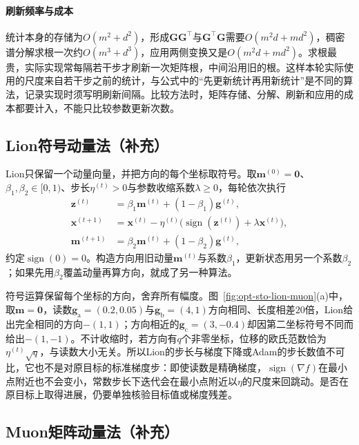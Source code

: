 \paragraph{刷新频率与成本}
统计本身的存储为$O(m^2+d^2)$，形成$\bm G\bm G^\top$与$\bm G^\top\bm G$需要$O(m^2d+md^2)$，稠密谱分解求根一次约$O(m^3+d^3)$，应用两侧变换又是$O(m^2d+md^2)$。求根最贵，实际实现常每隔若干步才刷新一次矩阵根，中间沿用旧的根。这样本轮实际使用的尺度来自若干步之前的统计，与公式中的“先更新统计再用新统计”是不同的算法，记录实现时须写明刷新间隔。比较方法时，矩阵存储、分解、刷新和应用的成本都要计入，不能只比较参数更新次数。

\subsection{Lion符号动量法（补充）}
\label{sec:opt-sto-lion}

Lion只保留一个动量向量，并把方向的每个坐标取符号。取$\bm m^{(0)}=\bm0$、$\beta_1,\beta_2\in[0,1)$、步长$\eta^{(t)}>0$与参数收缩系数$\lambda\geq0$，每轮依次执行
\[
  \begin{aligned}
    \bm z^{(t)}&=\beta_1\bm m^{(t)}+(1-\beta_1)\bm g^{(t)},\\
    \bm x^{(t+1)}&=\bm x^{(t)}-\eta^{(t)}\bigl(\operatorname{sign}(\bm z^{(t)})+\lambda\bm x^{(t)}\bigr),\\
    \bm m^{(t+1)}&=\beta_2\bm m^{(t)}+(1-\beta_2)\bm g^{(t)},
  \end{aligned}
\]
约定$\operatorname{sign}(0)=0$。构造方向用旧动量$\bm m^{(t)}$与系数$\beta_1$，更新状态用另一个系数$\beta_2$；如果先用$\beta_2$覆盖动量再算方向，就成了另一种算法。

符号运算保留每个坐标的方向，舍弃所有幅度。图~\ref{fig:opt-sto-lion-muon}(a)中，取$\bm m=\bm0$，读数$\bm g_{\mathrm a}=(0.2,0.05)$与$\bm g_{\mathrm b}=(4,1)$方向相同、长度相差$20$倍，Lion给出完全相同的方向$-(1,1)$；方向相近的$\bm g_{\mathrm c}=(3,-0.4)$却因第二坐标符号不同而给出$-(1,-1)$。不计收缩时，若方向有$q$个非零坐标，位移的欧氏范数恰为$\eta^{(t)}\sqrt q$，与读数大小无关。所以Lion的步长与梯度下降或Adam的步长数值不可比，它也不是对原目标的标准梯度步：即使读数是精确梯度，$\operatorname{sign}(\nabla f)$在最小点附近也不会变小，常数步长下迭代会在最小点附近以$\eta$的尺度来回跳动。是否在原目标上取得进展，仍要单独核验目标值或梯度残差。

\subsection{Muon矩阵动量法（补充）}
\label{sec:opt-sto-muon}

